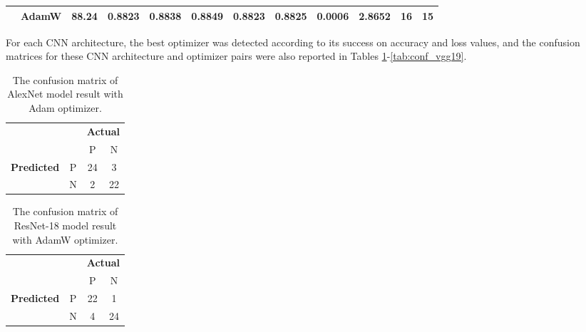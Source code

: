 \begin{landscape}
\begin{table}[!h]
\begin{tabular}{c|l|cccccc|cc|c|c}
                                    & AdamW                                                     & 88.24                  & 0.8823               & 0.8838               & 0.8849             & 0.8823    & 0.8825        & 0.0006                   & 2.8652             & 16                                                                                    & 15                                                                                     \\ \hline
\end{tabular}
\end{table}
\end{landscape}


For each CNN architecture, the best optimizer was detected according to its success on accuracy and loss values, and the confusion matrices for these CNN architecture and optimizer pairs were also reported in Tables \ref{tab:conf_alexnet}-\ref{tab:conf_vgg19}.
 
\begin{table}[!h]
\centering
\caption{The confusion matrix of AlexNet model result with Adam optimizer.}
\label{tab:conf_alexnet}
\begin{tabular}{|cc|c|c|}
\cline{1-4}
                                                 &   & \multicolumn{2}{c|}{\textbf{Actual}} \\ \cline{3-4} 
                                                 &   & P            & N            \\ \hline
\multicolumn{1}{|c|}{\multirow{2}{*}{\textbf{Predicted}}} & P & 24           & 3            \\ \cline{2-4} 
\multicolumn{1}{|c|}{}                           & N & 2            & 22           \\ \hline
\end{tabular}
\end{table}

\begin{table}[!h]
\centering
\caption{The confusion matrix of ResNet-18 model result with AdamW optimizer.}
\label{tab:conf_resnet18}
\begin{tabular}{|cc|c|c|}
\cline{1-4}
                                                 &   & \multicolumn{2}{c|}{\textbf{Actual}} \\ \cline{3-4} 
                                                 &   & P            & N            \\ \hline
\multicolumn{1}{|c|}{\multirow{2}{*}{\textbf{Predicted}}} & P & 22           & 1            \\ \cline{2-4} 
\multicolumn{1}{|c|}{}                           & N & 4            & 24           \\ \hline
\end{tabular}
\end{table}

